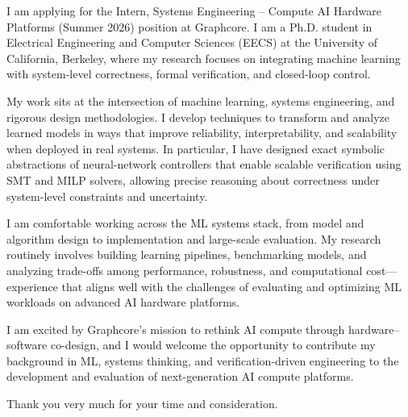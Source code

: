 I am applying for the Intern, Systems Engineering – Compute AI Hardware Platforms (Summer 2026) position at Graphcore. I am a Ph.D. student in Electrical Engineering and Computer Sciences (EECS) at the University of California, Berkeley, where my research focuses on integrating machine learning with system-level correctness, formal verification, and closed-loop control.

My work sits at the intersection of machine learning, systems engineering, and rigorous design methodologies. I develop techniques to transform and analyze learned models in ways that improve reliability, interpretability, and scalability when deployed in real systems. In particular, I have designed exact symbolic abstractions of neural-network controllers that enable scalable verification using SMT and MILP solvers, allowing precise reasoning about correctness under system-level constraints and uncertainty.

I am comfortable working across the ML systems stack, from model and algorithm design to implementation and large-scale evaluation. My research routinely involves building learning pipelines, benchmarking models, and analyzing trade-offs among performance, robustness, and computational cost—experience that aligns well with the challenges of evaluating and optimizing ML workloads on advanced AI hardware platforms.

I am excited by Graphcore’s mission to rethink AI compute through hardware–software co-design, and I would welcome the opportunity to contribute my background in ML, systems thinking, and verification-driven engineering to the development and evaluation of next-generation AI compute platforms.

Thank you very much for your time and consideration.
